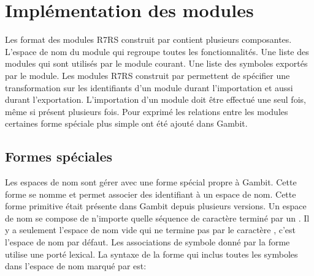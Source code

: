 
\chapter{Implémentation des modules}

Les format des modules R7RS construit par  contient
plusieurs composantes. L'espace de nom du module qui regroupe toutes les
fonctionnalités. Une liste des modules qui sont utilisés par le module courant.
Une liste des symboles exportés par le module.  Les modules R7RS construit par
 permettent de spécifier une transformation sur les
identifiants d'un module durant l'importation et aussi durant l'exportation.
L'importation d'un module doit être effectué une seul fois, même si présent
plusieurs fois.  Pour exprimé les relations entre les modules certaines forme
spéciale plus simple ont été ajouté dans Gambit.



\section{Formes spéciales}

Les espaces de nom sont gérer avec une forme spécial propre à Gambit. Cette
forme se nomme  et permet associer des identifiant à un
espace de nom. Cette forme primitive était présente dans Gambit depuis
plusieurs versions.  Un espace de nom se compose de n'importe quelle séquence
de caractère terminé par un \lstcode{#}. Il y a seulement l'espace de nom vide
qui ne termine pas par le caractère \lstcode{#}, c'est l'espace de nom par
défaut.  Les associations de symbole donné par la forme 
utilise une porté lexical. La syntaxe de la forme  qui
inclus toutes les symboles dans l'espace de nom marqué par  est:

